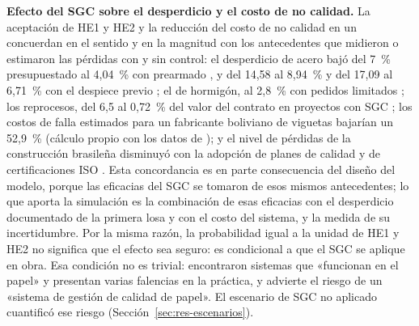 \textbf{Efecto del SGC sobre el desperdicio y el costo de no calidad.} La aceptación de HE1 y HE2 y la reducción del costo de no calidad en un \CNCreduccionPct{} concuerdan en el sentido y en la magnitud con los antecedentes que midieron o estimaron las pérdidas con y sin control: el desperdicio de acero bajó del 7~\% presupuestado al 4,04~\% con prearmado \parencite[p.~75]{galarza2011}, y del 14,58 al 8,94~\% y del 17,09 al 6,71~\% con el despiece previo \parencite[p.~192]{chino2024}; el de hormigón, al 2,8~\% con pedidos limitados \parencite[p.~73]{galarza2011}; los reprocesos, del 6,5 al 0,72~\% del valor del contrato en proyectos con SGC \parencite[p.~12]{alvarez2014}; los costos de falla estimados para un fabricante boliviano de viguetas bajarían un 52,9~\% (cálculo propio con los datos de \cite[pp.~142--143]{pajarito2015}); y el nivel de pérdidas de la construcción brasileña disminuyó con la adopción de planes de calidad y de certificaciones ISO \parencite[p.~106]{maciel2016}. Esta concordancia es en parte consecuencia del diseño del modelo, porque las eficacias del SGC se tomaron de esos mismos antecedentes; lo que aporta la simulación es la combinación de esas eficacias con el desperdicio documentado de la primera losa y con el costo del sistema, y la medida de su incertidumbre. Por la misma razón, la probabilidad igual a la unidad de HE1 y HE2 no significa que el efecto sea seguro: es condicional a que el SGC se aplique en obra. Esa condición no es trivial: \textcite[pp.~208--209]{romero2007} encontraron sistemas que «funcionan en el papel» y presentan varias falencias en la práctica, y \textcite[p.~148]{pajarito2015} advierte el riesgo de un «sistema de gestión de calidad de papel». El escenario de SGC no aplicado cuantificó ese riesgo (Sección~\ref{sec:res-escenarios}).

